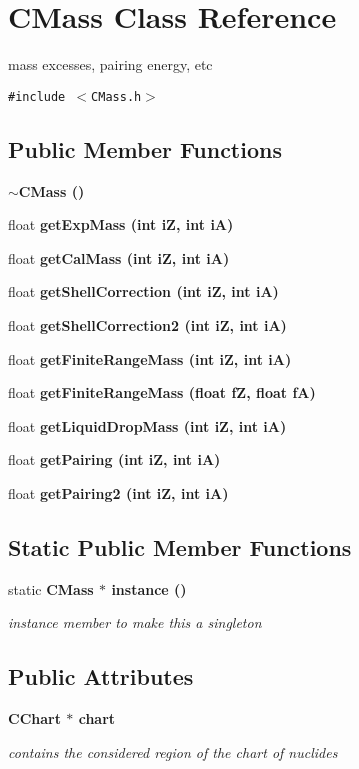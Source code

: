 \section{CMass Class Reference}
\label{classCMass}
mass excesses, pairing energy, etc  


{\tt \#include $<$CMass.h$>$}

\subsection*{Public Member Functions}
\begin{CompactItemize}
\item 
\bf{$\sim$CMass} ()
\item 
float \bf{get\-Exp\-Mass} (int i\-Z, int i\-A)
\item 
float \bf{get\-Cal\-Mass} (int i\-Z, int i\-A)
\item 
float \bf{get\-Shell\-Correction} (int i\-Z, int i\-A)
\item 
float \bf{get\-Shell\-Correction2} (int i\-Z, int i\-A)
\item 
float \bf{get\-Finite\-Range\-Mass} (int i\-Z, int i\-A)
\item 
float \bf{get\-Finite\-Range\-Mass} (float f\-Z, float f\-A)
\item 
float \bf{get\-Liquid\-Drop\-Mass} (int i\-Z, int i\-A)
\item 
float \bf{get\-Pairing} (int i\-Z, int i\-A)
\item 
float \bf{get\-Pairing2} (int i\-Z, int i\-A)
\end{CompactItemize}
\subsection*{Static Public Member Functions}
\begin{CompactItemize}
\item 
static \bf{CMass} $\ast$ \bf{instance} ()\label{classCMass_51bdc5af6783bf9c96a9aeab104caa94}

\begin{CompactList}\small\item\em instance member to make this a singleton \item\end{CompactList}\end{CompactItemize}
\subsection*{Public Attributes}
\begin{CompactItemize}
\item 
\bf{CChart} $\ast$ \bf{chart}\label{classCMass_123e5bd2e0b1741449817e01c45c377b}

\begin{CompactList}\small\item\em contains the considered region of the chart of nuclides \item\end{CompactList}\end{CompactItemize}
